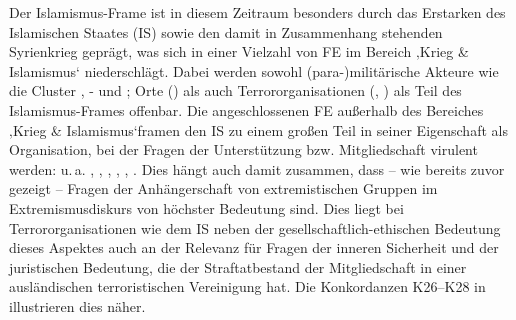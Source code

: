 Der Islamismus-Frame ist in diesem Zeitraum besonders durch das Erstarken des Islamischen Staates (IS) sowie den damit in Zusammenhang stehenden Syrienkrieg geprägt, was sich in einer Vielzahl von FE im Bereich ‚Krieg \& Islamismus` niederschlägt. Dabei werden sowohl (para\mbox{-})militärische Akteure wie die Cluster , - und ; Orte () als auch Terrororganisationen (, ) als Teil des Islamismus-Frames offenbar. Die angeschlossenen FE außerhalb des Bereiches ‚Krieg \& Islamismus`framen den IS zu einem großen Teil in seiner Eigenschaft als Organisation, bei der Fragen der Unterstützung bzw. Mitgliedschaft virulent werden: u.\,a. , , , , , . Dies hängt auch damit zusammen, dass -- wie bereits zuvor gezeigt -- Fragen der Anhängerschaft von extremistischen Gruppen im Extremismusdiskurs von höchster Bedeutung sind. Dies liegt bei Terrororganisationen wie dem IS neben der gesellschaftlich-ethischen Bedeutung dieses Aspektes auch an der Relevanz für Fragen der inneren Sicherheit und der juristischen Bedeutung, die der Straftatbestand der Mitgliedschaft in einer ausländischen terroristischen Vereinigung hat. Die Konkordanzen K26--K28 in  illustrieren dies näher.

